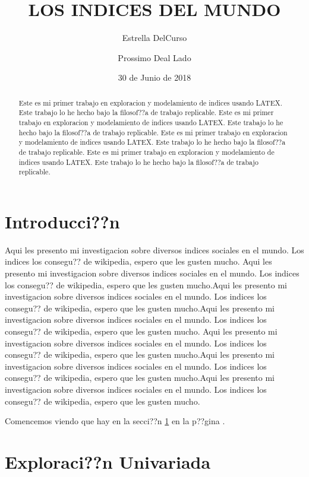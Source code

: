 \documentclass{article}
\title{LOS INDICES DEL MUNDO}
\author[1]{\normalsize Estrella DelCurso}
\author[2]{\normalsize Prossimo Deal Lado}
\affil[1,2]{\small  Escuela de Ingenier??a,Universidad de los Andes\\
\texttt{{delcurso,deallado}@uniandes.edu.col}}
\affil[1]{\small Instituto de altas investigaciones financieras\\
Banco del Parque\\
\texttt{delcurso@bp.com.col}}
\date{30 de Junio de 2018}
\begin{document}


\maketitle


\begin{abstract}
Este es mi primer trabajo en exploracion y modelamiento de indices usando LATEX. Este trabajo lo he hecho bajo la filosof??a de trabajo replicable. Este es mi primer trabajo en exploracion y modelamiento de indices usando LATEX. Este trabajo lo he hecho bajo la filosof??a de trabajo replicable. Este es mi primer trabajo en exploracion y modelamiento de indices usando LATEX. Este trabajo lo he hecho bajo la filosof??a de trabajo replicable. Este es mi primer trabajo en exploracion y modelamiento de indices usando LATEX. Este trabajo lo he hecho bajo la filosof??a de trabajo replicable.
\end{abstract}

\section*{Introducci??n}

Aqui les presento mi investigacion sobre diversos indices sociales en el mundo. Los indices los consegu?? de wikipedia, espero que les gusten mucho. Aqui les presento mi investigacion sobre diversos indices sociales en el mundo. Los indices los consegu?? de wikipedia, espero que les gusten mucho.Aqui les presento mi investigacion sobre diversos indices sociales en el mundo. Los indices los consegu?? de wikipedia, espero que les gusten mucho.Aqui les presento mi investigacion sobre diversos indices sociales en el mundo. Los indices los consegu?? de wikipedia, espero que les gusten mucho.
Aqui les presento mi investigacion sobre diversos indices sociales en el mundo. Los indices los consegu?? de wikipedia, espero que les gusten mucho.Aqui les presento mi investigacion sobre diversos indices sociales en el mundo. Los indices los consegu?? de wikipedia, espero que les gusten mucho.Aqui les presento mi investigacion sobre diversos indices sociales en el mundo. Los indices los consegu?? de wikipedia, espero que les gusten mucho.

Comencemos viendo que hay en la secci??n \ref{univariada} en la p??gina \pageref{univariada}.

\clearpage



\section{Exploraci??n Univariada}\label{univariada}
\end{document}
